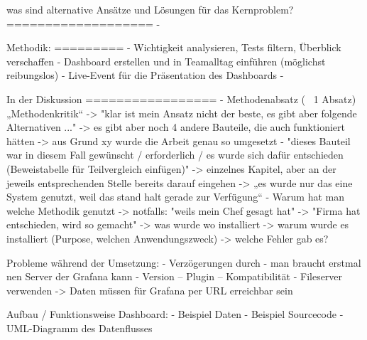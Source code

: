 was sind alternative Ansätze und Lösungen für das Kernproblem?
===================
- 

Methodik:
=========
- Wichtigkeit analysieren, Tests filtern, Überblick verschaffen
- Dashboard erstellen und in Teamalltag einführen (möglichst reibungslos)
- Live-Event für die Präsentation des Dashboards
- 

In der Diskussion
=================
- Methodenabsatz (~ 1 Absatz) „Methodenkritik“
 -> "klar ist mein Ansatz nicht der beste, es gibt aber folgende Alternativen ..."
 -> es gibt aber noch 4 andere Bauteile, die auch funktioniert hätten
 -> aus Grund xy wurde die Arbeit genau so umgesetzt - "dieses Bauteil war in diesem Fall gewünscht / erforderlich / es wurde sich dafür entschieden (Beweistabelle für Teilvergleich einfügen)"
 -> einzelnes Kapitel, aber an der jeweils entsprechenden Stelle bereits darauf eingehen
 -> „es wurde nur das eine System genutzt, weil das stand halt gerade zur Verfügung“
- Warum hat man welche Methodik genutzt
 -> notfalls: "weils mein Chef gesagt hat" -> "Firma hat entschieden, wird so gemacht"
 -> was wurde wo installiert
 -> warum wurde es installiert (Purpose, welchen Anwendungszweck)
 -> welche Fehler gab es?

Probleme während der Umsetzung: - Verzögerungen durch
- man braucht erstmal nen Server der Grafana kann 
- Version – Plugin – Kompatibilität
- Fileserver verwenden
-> Daten müssen für Grafana per URL erreichbar sein

Aufbau / Funktionsweise Dashboard:
- Beispiel Daten
- Beispiel Sourcecode
- UML-Diagramm des Datenflusses